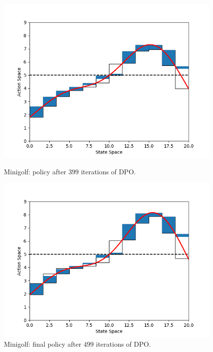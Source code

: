 \begin{figure}[h!]
	\centering
	\begin{minipage}[t]{.48\columnwidth}
		\includegraphics[width=\textwidth]{plots/it399.png}
		\caption{Minigolf: policy after $399$ iterations of DPO.}
		\label{fig:mg399}
	\end{minipage}%
	\hfill
	\begin{minipage}[t]{.48\columnwidth}
		\includegraphics[width=\textwidth]{plots/it499.png}
		\caption{Minigolf: final policy after $499$ iterations of DPO.}
		\label{fig:mg499}
	\end{minipage}
\end{figure}

\clearpage